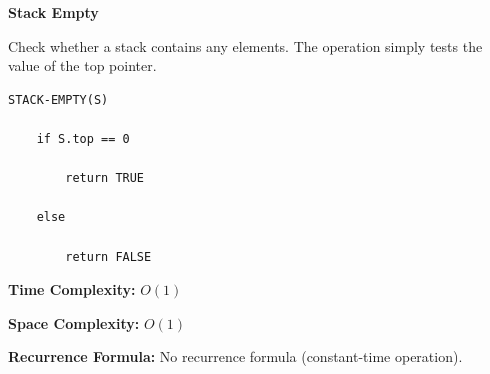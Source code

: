 \documentclass[a4paper,12pt]{article}
\begin{document}
\begin{tcolorbox}[
    colback=gray!30,
    colframe=black,
    boxrule=1pt,
    arc=0mm
]

\begin{tcolorbox}[
    colback=gray!10,
    colframe=black,
    arc=0mm
]
\centering
{\Huge\bfseries Stack Empty}
\end{tcolorbox}


\begin{tcolorbox}[
    colback=gray!10,
    colframe=black,
    arc=0mm
]
\small
Check whether a stack contains any elements.
The operation simply tests the value of the top pointer.
\end{tcolorbox}


\begin{tcolorbox}[
    colback=black!5,
    colframe=black,
    arc=0mm,
    title=Pseudo-code
]
\tiny
\begin{lstlisting}
STACK-EMPTY(S)

    if S.top == 0

        return TRUE

    else

        return FALSE
\end{lstlisting}
\end{tcolorbox}


\begin{tcolorbox}[
    colback=cyan!20,
    colframe=black,
    arc=0mm
]
\small
\textbf{Time Complexity:}
$O(1)$
\end{tcolorbox}


\begin{tcolorbox}[
    colback=violet!20,
    colframe=black,
    arc=0mm
]
\small
\textbf{Space Complexity:}
$O(1)$
\end{tcolorbox}


\begin{tcolorbox}[
    colback=pink!20,
    colframe=black,
    arc=0mm
]
\small
\textbf{Recurrence Formula:}
No recurrence formula (constant-time operation).
\end{tcolorbox}

\end{tcolorbox}
\end{document}
